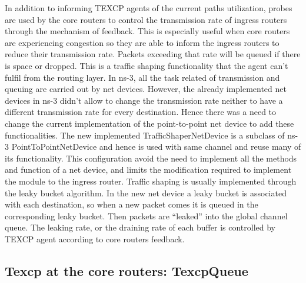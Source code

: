 In addition to informing TEXCP agents of the current paths utilization, probes are used by the core routers to control the transmission rate of ingress routers through the mechanism of feedback. This is especially useful when core routers are experiencing congestion so they are able to inform the ingress routers to reduce their transmission rate. Packets exceeding that rate will be queued if there is space or dropped. This is a traffic shaping functionality that the agent can't fulfil from the routing layer. In ns-3, all the task related of transmission and queuing are carried out by net devices. However, the already implemented net devices in ns-3 didn't allow to change the transmission rate neither to have a different transmission rate for every destination. Hence there was a need to change the current implementation of the point-to-point net device to add these functionalities. The new implemented TrafficShaperNetDevice is a subclass of ns-3 PointToPointNetDevice and hence is used with same channel and reuse many of its functionality. This configuration avoid the need to implement all the methods and function of a net device, and limits the modification required to implement the module to the ingress router. Traffic shaping is usually implemented through the leaky bucket algorithm. In the new net device a leaky bucket is associated with each destination, so when a new packet comes it is queued in the corresponding leaky bucket. Then packets are “leaked” into the global channel queue. The leaking rate, or the draining rate of each buffer is controlled  by TEXCP agent according to core routers feedback. 

\subsection{Texcp at the core routers: TexcpQueue}

